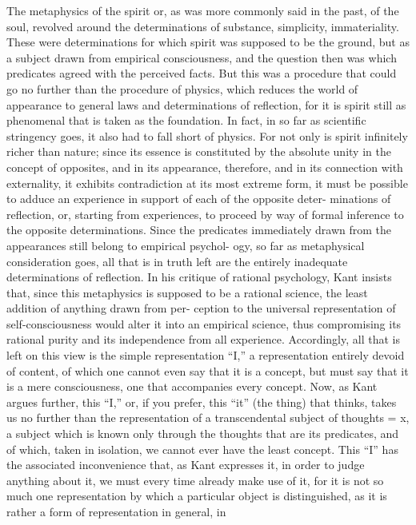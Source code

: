 The metaphysics of the spirit or, as was more commonly said in the past,
of the soul, revolved around the determinations of substance, simplicity,
immateriality. These were determinations for which spirit was supposed to
be the ground, but as a subject drawn from empirical consciousness, and
the question then was which predicates agreed with the perceived facts.
But this was a procedure that could go no further than the procedure
of physics, which reduces the world of appearance to general laws and
determinations of reflection, for it is spirit still as phenomenal that is taken
as the foundation. In fact, in so far as scientific stringency goes, it also
had to fall short of physics. For not only is spirit infinitely richer than
nature; since its essence is constituted by the absolute unity in the concept
of opposites, and in its appearance, therefore, and in its connection with
externality, it exhibits contradiction at its most extreme form, it must be
possible to adduce an experience in support of each of the opposite deter-
minations of reflection, or, starting from experiences, to proceed by way
of formal inference to the opposite determinations. Since the predicates
immediately drawn from the appearances still belong to empirical psychol-
ogy, so far as metaphysical consideration goes, all that is in truth left are
the entirely inadequate determinations of reflection.
 In his critique of
rational psychology, Kant insists that, since this metaphysics is supposed
to be a rational science, the least addition of anything drawn from per-
ception to the universal representation of self-consciousness would alter it
into an empirical science, thus compromising its rational purity and its
independence from all experience.
 Accordingly, all that is left on this
view is the simple representation “I,” a representation entirely devoid of
content, of which one cannot even say that it is a concept, but must say that
it is a mere consciousness, one that accompanies every concept. Now, as Kant
argues further, this “I,” or, if you prefer, this “it” (the thing) that thinks,
takes us no further than the representation of a transcendental subject of
thoughts = x, a subject which is known only through the thoughts that
are its predicates, and of which, taken in isolation, we cannot ever have
the least concept. This “I” has the associated inconvenience that, as Kant
expresses it, in order to judge anything about it, we must every time already
make use of it, for it is not so much one representation by which a particular
object is distinguished, as it is rather a form of representation in general, in
